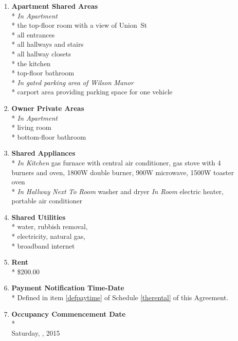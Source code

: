 \documentclass[12pt,letterpaper]{article}
\newcommand{\datefillin}{\hspace{0.2cm}\makebox[3cm]{\hrulefill}}
\newcommand{\condo}{Wilson Manor}
\newcommand{\apt}{Apartment}
\newcommand{\room}{Room}
\newcommand{\shared}{Apartment Shared Areas}
\newcommand{\livingroom}{Owner Private Areas}
\newcommand{\appliances}{Shared Appliances}
\newcommand{\utilities}{Shared Utilities}
\newcommand{\firstday}{Occupancy Commencement Date}
\newcommand{\paymenttime}{Payment Notification Time-Date}
\begin{document}
\begin{multicols}{2}
\begin{enumerate}
		\item \textbf{\shared{}}\\* \label{shared}
			\textit{In \apt{}}\\*
			the top-floor room with a view of Union~St\\*
			all entrances\\*
			all hallways and stairs\\*
			all hallway closets\\*
			the kitchen\\*
			top-floor bathroom\\*
			\textit{In gated parking area of \condo{}}\\*
			carport area providing parking space for one vehicle
			
		\item \textbf{\livingroom{}}\\* \label{livingroom}
			\textit{In \apt{}}\\*
			living room\\*
			bottom-floor bathroom
			
		\item \textbf{\appliances}\\* \label{appliances}
			\textit{In Kitchen} gas furnace with central air conditioner, 
			gas stove with 4 burners and oven, 
			1800W double burner,
			900W microwave,
			1500W toaster oven\\*
			\textit{In Hallway Next To \room{}} washer and dryer
			\textit{In \room{}} electric heater,
			portable air conditioner
			
		\item \textbf{\utilities{}}\\* \label{utilities}
			water,
			rubbish removal,\\*
			electricity,
			natural gas,\\*
			broadband internet

		\item \textbf{Rent}\\* \label{rent}
			\$200.00

		\item \textbf{\paymenttime{}}\\* \label{paymenttime}
			Defined in item \ref{defpaytime} of Schedule \ref{therental} of this Agreement.

		\item \textbf{\firstday{}} \label{firstday} \\* \\
			Saturday, \datefillin, 2015


\end{enumerate}
\end{multicols}
\end{document}
